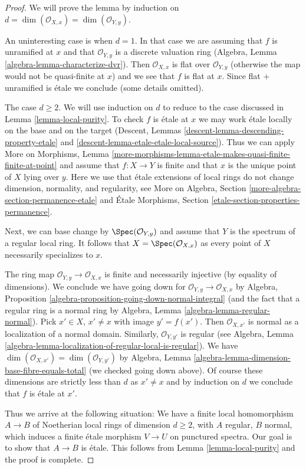 \begin{proof}
We will prove the lemma by induction on
$d = \dim(\mathcal{O}_{X, x}) = \dim(\mathcal{O}_{Y, y})$.

\medskip\noindent
An uninteresting case is when $d = 1$.
In that case we are assuming that $f$ is unramified at $x$
and that $\mathcal{O}_{Y, y}$ is a discrete valuation ring
(Algebra, Lemma \ref{algebra-lemma-characterize-dvr}).
Then $\mathcal{O}_{X, x}$ is flat over $\mathcal{O}_{Y, y}$
(otherwise the map would not be quasi-finite at $x$)
and we see that $f$ is flat at $x$. Since flat $+$
unramified is \'etale we conclude (some details omitted).

\medskip\noindent
The case $d \geq 2$. We will use induction on $d$ to reduce
to the case discussed in Lemma \ref{lemma-local-purity}.
To check $f$ is \'etale at $x$ we may work \'etale locally
on the base and on the target
(Descent, Lemmas \ref{descent-lemma-descending-property-etale} and
\ref{descent-lemma-etale-etale-local-source}).
Thus we can apply More on Morphisms, Lemma
\ref{more-morphisms-lemma-etale-makes-quasi-finite-finite-at-point}
and assume that $f : X \to Y$ is finite and that $x$ is the unique
point of $X$ lying over $y$. Here we use that \'etale extensions of
local rings do not change dimension, normality, and regularity, see
More on Algebra, Section \ref{more-algebra-section-permanence-etale}
and
\'Etale Morphisms, Section \ref{etale-section-properties-permanence}.

\medskip\noindent
Next, we can base change by $\Spec(\mathcal{O}_{Y, y})$
and assume that $Y$ is the spectrum of a regular local ring.
It follows that $X = \Spec(\mathcal{O}_{X, x})$ as
every point of $X$ necessarily specializes to $x$.

\medskip\noindent
The ring map $\mathcal{O}_{Y, y} \to \mathcal{O}_{X, x}$ is
finite and necessarily injective (by equality of dimensions).
We conclude we have going down for
$\mathcal{O}_{Y, y} \to \mathcal{O}_{X, x}$ by
Algebra, Proposition \ref{algebra-proposition-going-down-normal-integral}
(and the fact that a regular ring is a normal ring by
Algebra, Lemma \ref{algebra-lemma-regular-normal}).
Pick $x' \in X$, $x' \not = x$ with image $y' = f(x')$.
Then $\mathcal{O}_{X, x'}$ is normal as a localization
of a normal domain. Similarly, $\mathcal{O}_{Y, y'}$ is
regular (see Algebra, Lemma
\ref{algebra-lemma-localization-of-regular-local-is-regular}).
We have $\dim(\mathcal{O}_{X, x'}) = \dim(\mathcal{O}_{Y, y'})$ by
Algebra, Lemma \ref{algebra-lemma-dimension-base-fibre-equals-total}
(we checked going down above).
Of course these dimensions are strictly less than $d$ as $x' \not = x$
and by induction on $d$ we conclude that $f$ is \'etale at $x'$.

\medskip\noindent
Thus we arrive at the following situation: We have a finite
local homomorphism $A \to B$ of Noetherian local rings
of dimension $d \geq 2$, with $A$ regular, $B$ normal, which
induces a finite \'etale morphism $V \to U$ on punctured spectra.
Our goal is to show that $A \to B$ is \'etale.
This follows from Lemma \ref{lemma-local-purity}
and the proof is complete.
\end{proof}
